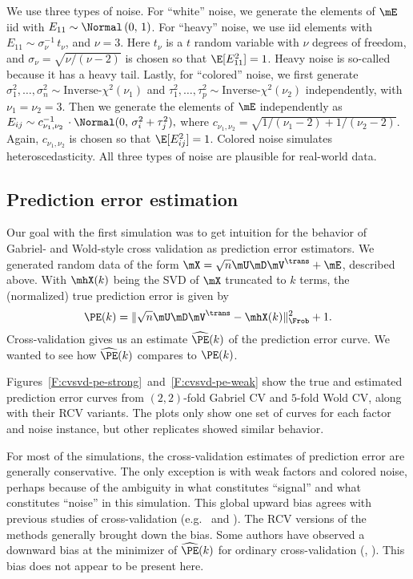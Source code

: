 We use three types of noise.  For ``white'' noise, we generate the elements of $\mE$ iid with $E_{11} \sim \Normal\left( 0, \, 1\right)$.  For ``heavy'' noise, we use iid elements with $E_{11} \sim \sigma_\nu^{-1} \, t_\nu$, and
$\nu = 3$.  Here $t_\nu$ is a $t$ random variable with $\nu$ degrees of freedom, and $\sigma_\nu = \sqrt{\nu/(\nu-2)}$ is chosen so that 
$\E [ E_{11}^2 ] = 1$.  Heavy noise is so-called because it has a heavy tail.  Lastly, for ``colored'' noise, we first generate
$\sigma^2_1, \ldots, \sigma^2_n \sim \text{Inverse-$\chi^2$}(\nu_1)$ and
$\tau^2_1, \ldots, \tau^2_p \sim \text{Inverse-$\chi^2$}(\nu_2)$ independently, with $\nu_1 = \nu_2 = 3$.  Then we generate the elements of $\mE$ independently as
\(
    E_{ij} \sim 
        c_{\nu_1, \nu_2}^{-1} \, \cdot \Normal( 0, \, \sigma^2_i + \tau^2_j),
\)
where
\(
    c_{\nu_1, \nu_2}
        =
        \sqrt{1/(\nu_1 - 2) + 1/(\nu_2 - 2)}
\).
Again, $c_{\nu_1, \nu_2}$ is chosen so that $\E [E_{ij}^2] = 1$.  Colored 
noise simulates heteroscedasticity.  All three types of noise are plausible 
for real-world data.


\subsection{Prediction error estimation}

Our goal with the first simulation was to get intuition for the behavior of
Gabriel- and Wold-style cross validation as prediction error estimators. We
generated random data of the form $\mX = \sqrt{n} \mU \mD \mV^\trans + \mE$,
described above. With $\mhX(k)$ being the SVD of $\mX$ truncated to $k$ terms,
the (normalized) true prediction error is given by
\[ 
    \PE(k) = \| \sqrt{n} \mU \mD \mV^\trans - \mhX(k) \|_\Frob^2 + 1. 
\] 
Cross-validation gives us an estimate $\widehat{\PE}(k)$ of the prediction 
error curve.  We wanted to see how $\widehat{\PE}(k)$ compares to $\PE(k)$.

Figures~\ref{F:cvsvd-pe-strong}~and~\ref{F:cvsvd-pe-weak} show the true and
estimated prediction error curves from $(2,2)$-fold Gabriel CV and $5$-fold
Wold CV, along with their RCV variants. The plots only show one set of curves
for each factor and noise instance, but other replicates showed similar
behavior.  

For most of the simulations, the cross-validation estimates of prediction
error are generally conservative. The only exception is with weak factors and
colored noise, perhaps because of the ambiguity in what constitutes ``signal''
and what constitutes ``noise'' in this simulation. This global upward bias
agrees with previous studies of cross-validation 
(e.g.~\cite{breiman1992little} and \cite{breiman1992submodel}).  The RCV versions of the methods generally brought down the bias.  Some authors have observed a downward bias at the minimizer of $\widehat{\PE}(k)$ for ordinary cross-validation (\cite{breiman1984cart}, \cite{tibshirani2009}).  This bias does not appear to be present here.

